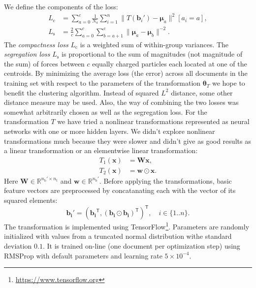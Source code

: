 \documentclass[10pt, a4paper]{article}
\newcommand{\vect}[1]{\bm{#1}}
\newcommand{\matr}[1]{\vect{#1}}
\newcommand{\transpose}{\mathsf T}
\begin{document}
We define the components of the loss: 
\begin{align}
	L_\mathrm{c} &= \sum_{a=0}^{c}\frac{1}{N_a} 
		\sum_{i=1}^{n} \| T(\vect{b}_i')-\vect{\mu}_{a}\|^2 [a_i=a], \\
	L_\mathrm{s} &= \frac{2}{c}\sum_{a=0}^{c}\sum_{b=a+1}^{c} \|\vect{\mu}_a-\vect{\mu}_b\|^{-2}.
\end{align}
The \emph{compactness loss} $L_\mathrm{c}$ is a weighted sum of within-group variances. The \emph{segregation loss}  $L_\mathrm{s}$ is proportional to the sum of magnitudes (not magnitude of the sum) of forces between $c$ equally charged particles each located at one of the centroids. By minimizing the average loss (the error) across all documents in the training set with respect to the parameters of the transformation $\vect{\theta}_T$ we hope to benefit the clustering algorithm. Instead of squared $L^2$ distance, some other distance measure may be used. Also, the way of combining the two losses was somewhat arbitrarily chosen as well as the segregation loss. For the transformation $T$ we have tried a nonlinear transformations represented as neural networks with one or more hidden layers. We didn't explore nonlinear transformations much because they were slower and didn't give as good results as a linear transformation or an elementwise linear transformation:
\begin{align}
	T_\mathrm{1}(\vect{x}) &= \matr{W}\vect{x}, \\
	T_\mathrm{2}(\vect{x}) &= \vect{w}\odot\vect{x}.
\end{align}
Here $\matr{W}\in \mathbb{R}^{n_\mathrm{b}'\times n_\mathrm{t}}$ and $\vect{w}\in \mathbb{R}^{n_\mathrm{b}'}$.
Before applying the transformations, basic feature vectors are preprocessed by concatanating each with the vector of its squared elements:
\begin{equation}
	\vect{b_i'} = (\vect{b_i}^\transpose, (\vect{b_i}\odot\vect{b_i})^\transpose)^\transpose, \quad i\in \{1..n\}.
\end{equation}
The transformation is implemented using TensorFlow\footnote{\url{https://www.tensorflow.org}}. Parameters are randomly initialized with values from a truncated normal distribution withe standard deviation $0.1$. It is trained on-line (one document per optimization step) using RMSProp \citep{tielman-2012} with default parameters and learning rate $5\times 10^{-4}$. 
\end{document}
